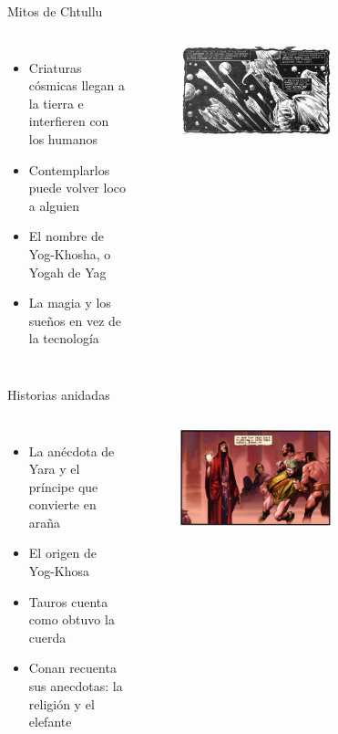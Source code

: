 \begin{frame}{Mitos de Chtullu}
\begin{columns}
 \begin{itemize}
    \item Criaturas cósmicas llegan a la tierra e interfieren con los humanos
    \item Contemplarlos puede volver loco a alguien
    \item El nombre de Yog-Khosha, o Yogah de Yag
    \item La magia y los sueños en vez de la tecnología
 \end{itemize}
    \begin{figure}[htb]
      \centering
      \includegraphics[width=0.6\textwidth]{img/tropes/mitos}
    \end{figure}
  \end{columns}
\end{frame}

\begin{frame}{Historias anidadas}
\begin{columns}
 \begin{itemize}
    \item La anécdota de Yara y el príncipe que convierte en araña
    \item El origen de Yog-Khosa
    \item Tauros cuenta como obtuvo la cuerda
    \item Conan recuenta sus anecdotas: la religión y el elefante
 \end{itemize}
    \begin{figure}[htb]
      \centering
      \includegraphics[width=0.6\textwidth]{img/tropes/historias}
    \end{figure}
  \end{columns}
\end{frame}

